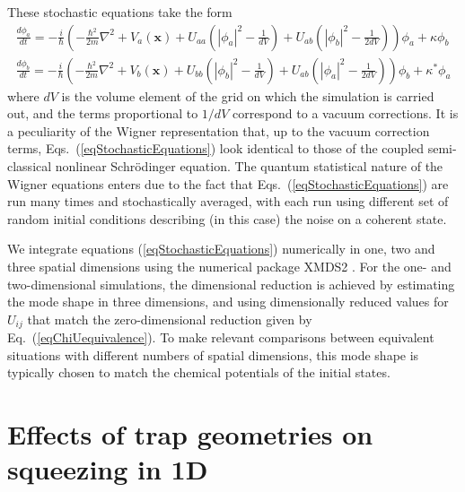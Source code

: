 \documentclass{iopart}
\begin{document}
These stochastic equations take the form
\begin{eqnarray}
\frac{d \phi_a}{dt} = -\frac{i}{\hbar}\left(-\frac{\hbar^2}{2 m}\nabla^2+V_a(\mathbf{x}) + U_{a a} \left( \left|\phi_{a}\right|^2 -\frac{1}{dV}\right) + U_{a b} \left( \left|\phi_b\right|^2 -\frac{1}{2dV}\right)  \right)\phi_a   + \kappa \phi_b  \nonumber \\
\frac{d \phi_b}{dt} = -\frac{i}{\hbar}\left(-\frac{\hbar^2}{2 m}\nabla^2+V_b(\mathbf{x}) + U_{b b} \left( \left|\phi_{b}\right|^2 - \frac{1}{dV} \right) + U_{a b} \left( \left|\phi_a\right|^2 -\frac{1}{2dV} \right)   \right)\phi_b   + \kappa^* \phi_a
  \label{eqStochasticEquations}
\end{eqnarray}
where $dV$ is the volume element of the grid on which the simulation is carried out, and the terms proportional to $1/dV$ correspond to a vacuum corrections. It is a peculiarity of the Wigner representation that, up to the vacuum correction terms, Eqs.~(\ref{eqStochasticEquations}) look identical to those of the coupled semi-classical nonlinear Schr{\"{o}}dinger equation. The quantum statistical nature of the Wigner equations enters due to the fact that Eqs.~(\ref{eqStochasticEquations}) are run many times and stochastically averaged, with each run using different set of random initial conditions describing (in this case) the noise on a coherent state.

We integrate equations (\ref{eqStochasticEquations}) numerically in one, two and three spatial dimensions using the numerical package XMDS2 \cite{dennis2013}.  For the one- and two-dimensional simulations, the dimensional reduction is achieved by estimating the mode shape in three dimensions, and using dimensionally reduced values for $U_{ij}$ that match the zero-dimensional reduction given by Eq.~(\ref{eqChiUequivalence}).  To make relevant comparisons between equivalent situations with different numbers of spatial dimensions, this mode shape is typically chosen to match the chemical potentials of the initial states.  

\section{Effects of trap geometries on squeezing in 1D}
\end{document}
